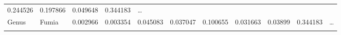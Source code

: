 \documentclass[
]{article}
\begin{document}
\begin{longtable}[]{@{}lllllllllll@{}}
\begin{minipage}[t]{0.09\columnwidth}
0.244526\strut
\end{minipage} & \begin{minipage}[t]{0.06\columnwidth}\raggedright
0.197866\strut
\end{minipage} & \begin{minipage}[t]{0.06\columnwidth}\raggedright
0.049648\strut
\end{minipage} & \begin{minipage}[t]{0.06\columnwidth}\raggedright
0.344183\strut
\end{minipage} & \begin{minipage}[t]{0.03\columnwidth}\raggedright
\ldots{}\strut
\end{minipage}\tabularnewline
\begin{minipage}[t]{0.06\columnwidth}\raggedright
Genus\strut
\end{minipage} & \begin{minipage}[t]{0.06\columnwidth}\raggedright
Fumia\strut
\end{minipage} & \begin{minipage}[t]{0.09\columnwidth}\raggedright
0.002966\strut
\end{minipage} & \begin{minipage}[t]{0.06\columnwidth}\raggedright
0.003354\strut
\end{minipage} & \begin{minipage}[t]{0.09\columnwidth}\raggedright
0.045083\strut
\end{minipage} & \begin{minipage}[t]{0.06\columnwidth}\raggedright
0.037047\strut
\end{minipage} & \begin{minipage}[t]{0.09\columnwidth}\raggedright
0.100655\strut
\end{minipage} & \begin{minipage}[t]{0.06\columnwidth}\raggedright
0.031663\strut
\end{minipage} & \begin{minipage}[t]{0.06\columnwidth}\raggedright
0.03899\strut
\end{minipage} & \begin{minipage}[t]{0.06\columnwidth}\raggedright
0.344183\strut
\end{minipage} & \begin{minipage}[t]{0.03\columnwidth}\raggedright
\ldots{}\strut
\end{minipage}\tabularnewline
\begin{minipage}[t]{0.06\columnwidth}\raggedright

\end{minipage}
\end{longtable}
\end{document}
